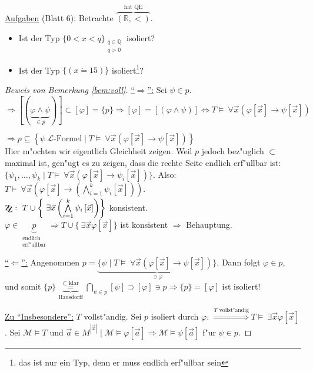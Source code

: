 \documentclass[a4paper,12pt,numbers=noenddot,parskip=full]{scrartcl}
\newcommand{\setQ}{\mathbb{Q}}
\newcommand{\setR}{\mathbb{R}}
\newcommand{\Forall}{~\forall}
\newcommand{\Exists}{~\exists}
\newcommand{\scrL}{\mathcal{L}}
\newcommand{\zz}{\mathrm{Z\kern-.3em\raise-0.5ex\hbox{Z}}:~}
\newcommand{\heading}{\underline}
\theoremstyle{dotless}
\begin{document}
\heading{Aufgaben} (Blatt 6): Betrachte $\overbrace{(\setR, <)}^{\text{hat QE}}$. 
\begin{itemize}
	\item Ist der Typ $\{0 < x < q \}_{\substack{q \in \setQ\\q>0}}$ isoliert?
	\item Ist der Typ $\{(x \dot= 15) \}$ isoliert\footnote{das ist nur ein Typ, denn er muss endlich erf"ullbar sein}?
\end{itemize}
\begin{proof}[Beweis von Bemerkung \ref{bem:voll}]
	\underline{"`$\Rightarrow$"':} Sei $\psi \in p$. $\Longrightarrow \left[(\underbrace{\varphi \land \psi}_{\in p})\right] \subset [\varphi] = \{p\} \Longrightarrow [\varphi] = \left[(\varphi \land \psi)\right] \Longleftrightarrow T \models \Forall \vec{x} (\varphi[\vec{x}]\rightarrow\psi[\vec{x}])$
	
	$\Longrightarrow p \overset{}{\subseteq} \left\{\psi~ \scrL \text{-Formel} \mid T\models \Forall \vec{x} (\varphi[\vec{x}]\rightarrow \psi[\vec{x}]) \right\}$\\
	Hier m"ochten wir eigentlich Gleichheit zeigen. Weil $p$ jedoch bez"uglich $\subset$ maximal ist, gen"ugt es zu zeigen, dass die rechte Seite endlich erf"ullbar ist: $\{\psi_1, \dots, \psi_k \mid T \models \Forall \vec{x}(\varphi[\vec{x}]\rightarrow \psi_i[\vec{x}]) \}$. Also: $T \models \Forall \vec{x} (\varphi[\vec{x}] \rightarrow (\bigwedge\limits_{i=1}^k \psi_i[\vec{x}]))$.\\ 
	$\zz T \cup \left\{\Exists \vec{x} \left(\bigwedge\limits_{i=1}^k \psi_i\left[\vec{x}\right]\right) \right\}$ konsistent.\\
	$\varphi \in \underbrace{p}_{\substack{\text{endlich}\\\text{erf"ullbar}}} \Longrightarrow T\cup \{ \Exists \vec{x} \varphi[\vec{x}] \}$ ist konsistent $\Longrightarrow$ Behauptung.
	
	\underline{"`$\Leftarrow$"':} Angenommen $p = \underbrace{\{\psi \mid T \models \Forall \vec{x} (\varphi[\vec{x}] \rightarrow \psi[\vec{x}]) \}}_{\ni \varphi}$. Dann folgt $\varphi \in p$, und somit $\{p\} \underbrace{\overset{\subset \text{ klar}}{=}}_{\text{Hausdorff}} \bigcap\limits_{\psi \in p} [\psi] \supset [\varphi] \ni p \Longrightarrow \{p\} = [\varphi]$ ist isoliert!
	
	\underline{Zu "`Insbesondere"':} $T$ vollst"andig. Sei $p$ isoliert durch $\varphi$. $\overset{T \text{ vollst"andig}}{\Longrightarrow} T \models \Exists \vec{x} \varphi[\vec{x}]$. Sei $\mathcal{M} \models T$ und $\vec{a} \in M^{|\vec{x}|} \mid \mathcal{M} \models \varphi[\vec{a}] \Longrightarrow \mathcal{M} \models \psi [\vec{a}]$ f"ur $\psi \in p$.
\end{proof}
\end{document}
